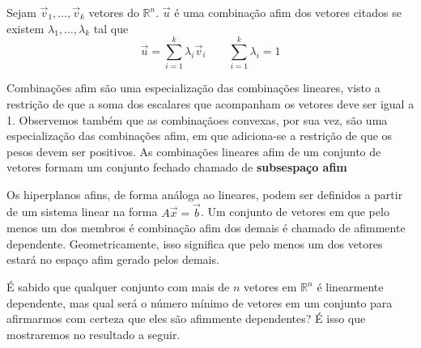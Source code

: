 \begin{def:combinação afim}
Sejam $\vec v_1, \ldots, \vec v_k$ vetores do $\mathbb{R}^n$. $\vec u$ é uma
combinação afim dos vetores citados  se existem $\lambda_1, \ldots,
\lambda_k$ tal que
\begin{equation*}
	\vec u = \sum_{i =1}^{k}\lambda_i \vec v_i \quad \quad \sum_{i=1}^{k} \lambda_i = 1
\end{equation*}
\end{def:combinação afim}
Combinações afim são uma especialização das combinações
lineares, visto a restrição de que a soma dos escalares
que acompanham os vetores deve ser igual a 1. Observemos
também que as combinaçãoes convexas, por sua vez, são uma
especialização das combinações afim, em que adiciona-se a
restrição de que os pesos devem ser positivos.
As combinações lineares afim de um conjunto de vetores
formam um conjunto fechado chamado de \textbf{subsespaço afim}


Os hiperplanos  afins, de forma análoga ao lineares, podem ser
definidos a partir de um sistema linear na forma $A\vec x = \vec b$.
Um conjunto de vetores em que pelo menos um dos membros
é combinação afim dos demais é chamado de afimmente dependente.
Geometricamente, isso significa que pelo menos um dos vetores estará
no espaço afim gerado pelos demais.

É sabido que qualquer conjunto com mais de $n$ vetores em
$\mathbb{R}^n$ é linearmente dependente, mas qual será o número mínimo
de vetores em um conjunto para afirmarmos com certeza que eles são
afimmente dependentes? É isso que mostraremos no
resultado a seguir.


%

